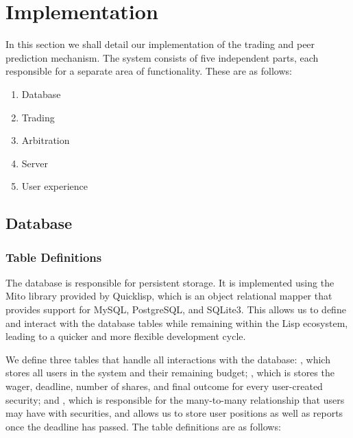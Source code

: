 \section{Implementation}

\label{sec:implementation}

In this section we shall detail our implementation of the trading and peer
prediction mechanism. The system consists of five independent parts, each
responsible for a separate area of functionality. These are as follows:

\begin{enumerate}
	\item Database
	\item Trading
	\item Arbitration
	\item Server
	\item User experience
\end{enumerate}

\subsection{Database}

\label{sec:database}

\subsubsection{Table Definitions}

The database is responsible for persistent storage. It is implemented using the
Mito library provided by Quicklisp, which is an object relational mapper that
provides support for MySQL, PostgreSQL, and SQLite3. This allows us to define
and interact with the database tables while remaining within the Lisp
ecosystem, leading to a quicker and more flexible development cycle.

We define three tables that handle all interactions with the database:
, which stores all users in the system and their remaining budget;
, which is stores the wager, deadline, number of shares, and
final outcome for every user-created security; and , which
is responsible for the many-to-many relationship that users may have with
securities, and allows us to store user positions as well as reports once the
deadline has passed. The table definitions are as follows:

